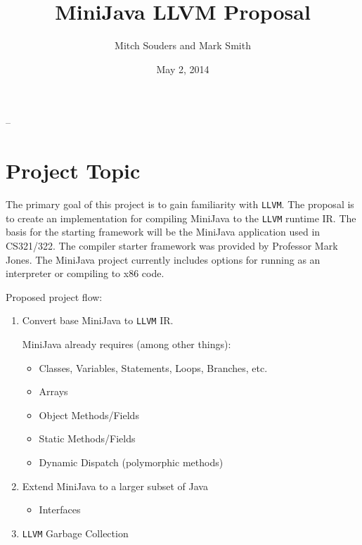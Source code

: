 \documentclass[12pt]{article}
\title{MiniJava LLVM Proposal}
\author{Mitch Souders and Mark Smith}
\date{May 2, 2014}
\begin{document}
\makeatletter
\def\maketitle{\par{\centerline{\huge\bfseries\@title}}\par\@author -- \@date}
\makeatother

\maketitle

\section*{Project Topic}
The primary goal of this project is to gain familiarity with \texttt{LLVM}. The proposal is to create an implementation for compiling MiniJava to the \texttt{LLVM} runtime IR.  The basis for the starting framework will be the MiniJava application used in CS321/322.  The compiler starter framework was provided by Professor Mark Jones.  The MiniJava project currently includes options for running as an interpreter or compiling to x86 code.

Proposed project flow:
\begin{enumerate}
\item Convert base MiniJava to \texttt{LLVM} IR.

    MiniJava already requires (among other things):
    \begin{itemize}
    \item Classes, Variables, Statements, Loops, Branches, etc.
    \item Arrays
    \item Object Methods/Fields
    \item Static Methods/Fields
    \item Dynamic Dispatch (polymorphic methods)
    \end{itemize}
\item Extend MiniJava to a larger subset of Java
    \begin{itemize}
    \item Interfaces
    \end{itemize}
\item \texttt{LLVM} Garbage Collection
\end{enumerate}
\end{document}
